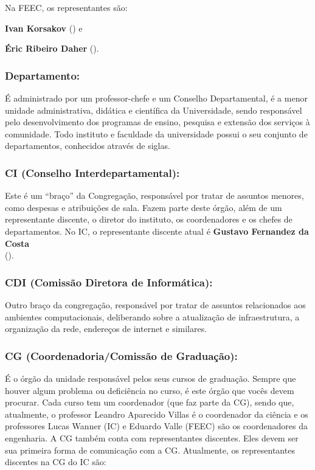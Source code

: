 Na FEEC, os representantes são:

\begin{compactitemize}
\item \textbf{Ivan Korsakov} () e
\item \textbf{Éric Ribeiro Daher} ().
\end{compactitemize}

\subsubsection{Departamento:} É administrado por um professor-chefe e um
Conselho Departamental, é a menor unidade administrativa, didática e científica
da Universidade, sendo responsável pelo desenvolvimento dos programas de
ensino, pesquisa e extensão dos serviços à comunidade. Todo instituto e
faculdade da universidade possui o seu conjunto de departamentos, conhecidos
através de siglas.

\subsubsection{CI (Conselho Interdepartamental):} Este é um ``braço'' da
Congregação, responsável por tratar de assuntos menores, como despesas e
atribuições de sala. Fazem parte deste órgão, além de um representante
discente, o diretor do instituto, os coordenadores e os chefes de
departamentos. No IC, o representante discente atual é \textbf{Gustavo
Fernandez da Costa}\\
().

\subsubsection{CDI (Comissão Diretora de Informática):} Outro braço da
congregação, responsável por tratar de assuntos relacionados aos ambientes
computacionais, deliberando sobre a atualização de infraestrutura, a
organização da rede, endereços de internet e similares.

\subsubsection{CG (Coordenadoria/Comissão de Graduação):} É o órgão da unidade
responsável pelos seus cursos de graduação. Sempre que houver algum problema ou
deficiência no curso, é este órgão que vocês devem procurar.  Cada curso tem um
coordenador (que faz parte da CG), sendo que, atualmente, o professor Leandro
Aparecido Villas é o coordenador da ciência e os professores Lucas Wanner (IC)
e Eduardo Valle (FEEC) são os coordenadores da engenharia. A CG também conta
com representantes discentes. Eles devem ser sua primeira forma de comunicação
com a CG.  Atualmente, os representantes discentes na CG do IC são:


